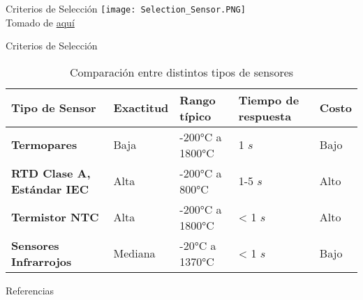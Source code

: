 \documentclass[aspectratio=169]{beamer}
\begin{document}
\begin{frame}{Criterios de Selección}
    \centering
    \texttt{[image: Selection\_Sensor.PNG]}
            \\ \tiny{Tomado de \href{https://www.mechaterrain.com/lm35-temperature-sensor}{aquí}}
\end{frame}
\begin{frame}{Criterios de Selección}
  \begin{table}[]
    \centering
    \begin{tabular}{m{2cm} m{1.5cm} m{1.55cm} m{2cm} m{1.4cm}}
        \toprule
        \textbf{Tipo de Sensor} & \textbf{Exactitud} &\textbf{Rango típico} & \textbf{Tiempo de respuesta} & \textbf{Costo} \\
        \midrule
        \textbf{Termopares} & Baja & -200$\si{\celsius}$ a 1800$\si{\celsius}$ & 1 $s$ & Bajo\\
        \textbf{RTD Clase A, Estándar IEC} & Alta & -200$\si{\celsius}$ a 800$\si{\celsius}$ & 1-5 $s$ & Alto\\
        \textbf{Termistor NTC} & Alta & -200$\si{\celsius}$ a 1800$\si{\celsius}$ & < 1 $s$ & Alto\\
        \textbf{Sensores Infrarrojos} & Mediana & -20$\si{\celsius}$ a 1370$\si{\celsius}$ & < 1 $s$ & Bajo \\
        \bottomrule
    \end{tabular}
    \caption{Comparación entre distintos tipos de sensores}
    \label{tab:Comparacion}
\end{table}
\end{frame}

\begin{frame}{Referencias}
\footnotesize
\printbibliography[heading=none]
\end{frame}
\end{document}
